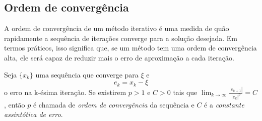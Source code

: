 
\subsection{Ordem de convergência}

A ordem de convergência de um método iterativo é uma medida de quão rapidamente
a sequência de iterações converge para a solução desejada. Em termos práticos,
isso significa que, se um método tem uma ordem de convergência alta, ele será
capaz de reduzir mais o erro de aproximação a cada iteração.
\begin{df}
    Seja $\{x_k\}$ uma sequência que converge para $\xi$ e
    \begin{equation} \label{erro}
        e_k = x_k - \xi
    \end{equation}
    o erro na k-ésima iteração.
    Se existirem $p > 1$ e $C > 0$ tais que $\lim_{k \to \infty}
        \frac{|e_{k+1}|}{|e_k|^p} = C$, então $p$ é chamada de \emph{ordem de
        convergência} da sequência e $C$ é a \emph{constante assintótica de erro}.
\end{df}

